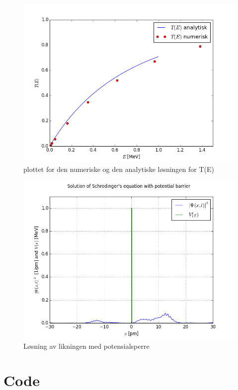 \documentclass[norsk,a4paper,12pt]{article}
\begin{document}
\begin{figure}
\includegraphics[scale=0.7]{2c2.png}
\caption{plottet for den numeriske og den analytiske løsningen for T(E)}
\label{fig:2c2}
\end{figure}


\begin{figure}
\includegraphics[scale=0.7]{24.png}
\caption{Løsning av likningen med potensialsperre}
\label{fig:24}
\end{figure}


\newpage

\section*{Code}












\end{document}
